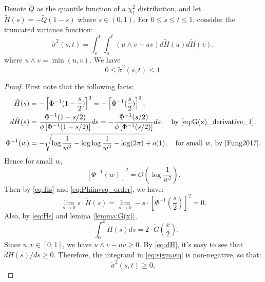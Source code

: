\begin{lemma}
	\label{lemma:sigmasq}
	Denote $\tilde{Q}$ as the quantile function of a $\chi_1^2$ distribution, and let $\tilde{H}(s) = -\tilde{Q}(1-s)$ where $s\in (0,1)$. For $0\le s \le t \le 1$, consider the truncated variance function:
	\begin{equation}
	\tilde{\sigma}^2(s,t) = \int_{s}^{t} \int_{s}^{t} (u \wedge v -uv) d \tilde{H}(u) d \tilde{H}(v),
	\label{eq:sigmasq}
	\end{equation}
	where $u \wedge v =\min(u,v)$. We have
	\begin{equation*}
	0 \le \tilde{\sigma}^2(s,t) \le 1.
	\end{equation*}
\end{lemma}
\begin{proof}
	First note that the following facts:
	\begin{align}
	\tilde{H}(s) &= -\left[\Phi^{-1}(1-\frac{s}{2}) \right]^2=-\left[\Phi^{-1}(\frac{s}{2}) \right]^2,\label{eq:Hs} \\
	d\tilde{H}(s) &= \frac{\Phi^{-1}(1-s/2)}{\phi\left[\Phi^{-1}(1-s/2)\right]}ds=-\frac{\Phi^{-1}(s/2)}{\phi\left[\Phi^{-1}(s/2)\right]}ds, \quad \text{by \eqref{eq:G(x)_derivative_1}},\label{eq:dH} \\
	\Phi^{-1}(w) &= -\sqrt{\log\frac{1}{w^2} - \log\log\frac{1}{w^2} - \log(2\pi)} + o(1), \quad \text{for small $w$, by \cite{Fung2017}}. \label{eq:Phiinv_order}
	\end{align}
	Hence for small $w$,
	\begin{equation}
	\label{eq:Phiinvsq_order}
	\left[\Phi^{-1}(w)\right]^2 = O(\log \frac{1}{w^2}).
	\end{equation}
	Then by \eqref{eq:Hs} and \eqref{eq:Phiinvsq_order}, we have:
	\begin{equation}
	\label{eq:sHs_limit}
	\lim_{s \to 0} s\cdot \tilde{H}(s) = \lim_{s \to 0} -s\cdot \left[\Phi^{-1}(\frac{s}{2})\right]^2 = 0.
	\end{equation}
	Also, by \eqref{eq:Hs} and lemma \ref{lemma:G(x)},
	\begin{equation}
	\label{eq:Hs_integral}
	-\int_{0}^{x} \tilde{H}(s) ds =  2\cdot \tilde{G}(\frac{x}{2}).
	\end{equation}
	Since $u,v\in[0,1]$, we have $u \wedge v-uv \ge 0$. By \eqref{eq:dH}, it's easy to see that $d\tilde{H}(s)/ds \ge 0$. Therefore, the integrand in \eqref{eq:sigmasq} is non-negative, so that:
	\begin{equation*}
	\tilde{\sigma}^2(s,t) \ge 0,
	\end{equation*}

\end{proof}

